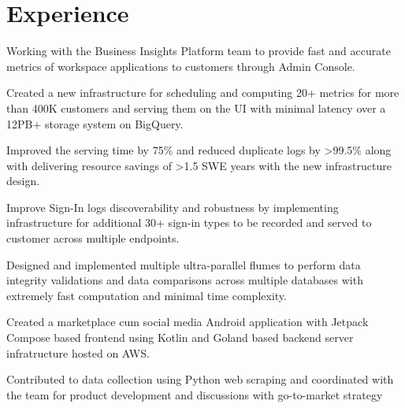 \documentclass[]{deedy-resume-openfont}
\begin{document}
\begin{minipage}[t]{0.66\textwidth} 


\section{Experience}
\vspace{\topsep} %
\begin{tightemize}
\item Working with the Business Insights Platform team to provide fast and accurate metrics of workspace applications to customers through Admin Console.
\item Created a new infrastructure for scheduling and computing 20+ metrics for more than 400K customers and serving them on the UI with minimal latency over a 12PB+ storage system on BigQuery.
\item Improved the serving time by 75\% and reduced duplicate logs by >99.5\% along with delivering resource savings of >1.5 SWE years with the new infrastructure design.
\item Improve Sign-In logs discoverability and robustness by implementing infrastructure for additional 30+ sign-in types to be recorded and served to customer across multiple endpoints.
\item Designed and implemented multiple ultra-parallel flumes to perform data integrity validations and data comparisons across multiple databases with extremely fast computation and minimal time complexity.
\end{tightemize}

\begin{tightemize}
\item Created a marketplace cum social media Android application with Jetpack Compose based frontend using Kotlin and Goland based backend server infratructure hosted on AWS.
\item Contributed to data collection using Python web scraping and coordinated with the team for product development and discussions with go-to-market strategy
\end{tightemize}


\end{minipage}
\end{document}
